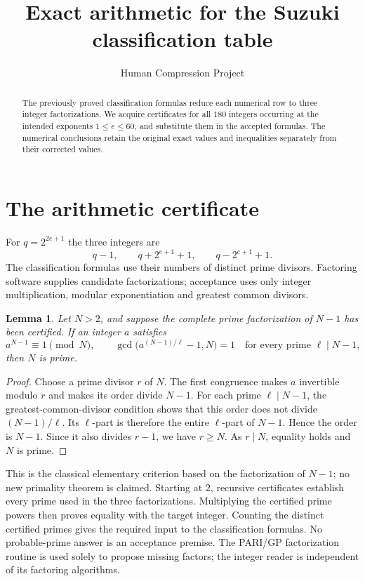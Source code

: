\documentclass[11pt]{article}
\title{Exact arithmetic for the Suzuki classification table}
\author{Human Compression Project}
\date{}
\newtheorem{lemma}{Lemma}
\begin{document}
\maketitle
\begin{abstract}
The previously proved classification formulas reduce each numerical row to
three integer factorizations. We acquire certificates for all $180$ integers
occurring at the intended exponents $1\le e\le60$, and substitute them in the
accepted formulas. The numerical conclusions retain the original exact
values and inequalities separately from their corrected values.
\end{abstract}

\section{The arithmetic certificate}
For $q=2^{2e+1}$ the three integers are
\[
 q-1,\qquad q+2^{e+1}+1,\qquad q-2^{e+1}+1.
\]
The classification formulas use their numbers of distinct prime divisors.
Factoring software supplies candidate factorizations; acceptance uses only
integer multiplication, modular exponentiation and greatest common divisors.

\begin{lemma}
Let $N>2$, and suppose the complete prime factorization of $N-1$ has been
certified. If an integer $a$ satisfies
\[
 a^{N-1}\equiv1\pmod N,\qquad
 \gcd\bigl(a^{(N-1)/\ell}-1,N\bigr)=1
 \quad\text{for every prime }\ell\mid N-1,
\]
then $N$ is prime.
\end{lemma}
\begin{proof}
Choose a prime divisor $r$ of $N$. The first congruence makes $a$ invertible
modulo $r$ and makes its order divide $N-1$. For each prime $\ell\mid N-1$,
the greatest-common-divisor condition shows that this order does not divide
$(N-1)/\ell$. Its $\ell$-part is therefore the entire $\ell$-part of $N-1$.
Hence the order is $N-1$. Since it also divides $r-1$, we have $r\ge N$.
As $r\mid N$, equality holds and $N$ is prime.
\end{proof}

This is the classical elementary criterion based on the factorization of
$N-1$; no new primality theorem is claimed. Starting at $2$, recursive
certificates establish every prime used in the three factorizations.
Multiplying the certified prime powers then proves equality with the target
integer. Counting the distinct certified primes gives the required input
to the classification formulas. No probable-prime answer is an acceptance
premise. The PARI/GP factorization routine is used solely to propose missing
factors; the integer reader is independent of its factoring algorithms.
\end{document}
